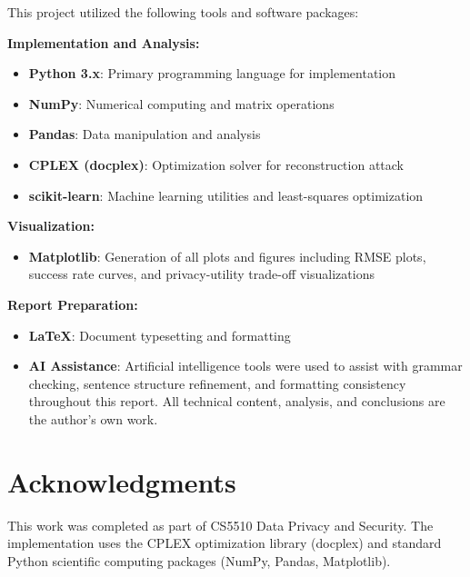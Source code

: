 \documentclass[11pt,letterpaper]{article}
\begin{document}
This project utilized the following tools and software packages:

\textbf{Implementation and Analysis:}
\begin{itemize}[leftmargin=*]
    \item \textbf{Python 3.x}: Primary programming language for implementation
    \item \textbf{NumPy}: Numerical computing and matrix operations
    \item \textbf{Pandas}: Data manipulation and analysis
    \item \textbf{CPLEX (docplex)}: Optimization solver for reconstruction attack
    \item \textbf{scikit-learn}: Machine learning utilities and least-squares optimization
\end{itemize}

\textbf{Visualization:}
\begin{itemize}[leftmargin=*]
    \item \textbf{Matplotlib}: Generation of all plots and figures including RMSE plots, success rate curves, and privacy-utility trade-off visualizations
\end{itemize}

\textbf{Report Preparation:}
\begin{itemize}[leftmargin=*]
    \item \textbf{\LaTeX}: Document typesetting and formatting
    \item \textbf{AI Assistance}: Artificial intelligence tools were used to assist with grammar checking, sentence structure refinement, and formatting consistency throughout this report. All technical content, analysis, and conclusions are the author's own work.
\end{itemize}

\section*{Acknowledgments}

This work was completed as part of CS5510 Data Privacy and Security. The implementation uses the CPLEX optimization library (docplex) and standard Python scientific computing packages (NumPy, Pandas, Matplotlib).
\end{document}
